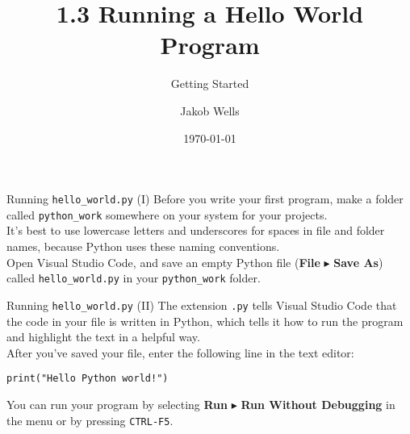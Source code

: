 \documentclass[aspectratio=169]{beamer}
\title{1.3 Running a Hello World Program}
\subtitle{Getting Started}
\author{Jakob Wells}
\begin{document}
\date{\today}


\begin{frame}
    \titlepage{}
\end{frame}


\begin{frame}[fragile]{Running \texttt{hello\_world.py} (I)}
    Before you write your first program, make a folder called \texttt{python\_work} somewhere on your system for your projects. \\
    \vspace{15pt}
    It's best to use lowercase letters and underscores for spaces in file and folder names, because Python uses these naming conventions.\\
    \vspace{15pt}
    Open Visual Studio Code, and save an empty Python file (\textbf{File} \(\blacktriangleright\) \textbf{Save As}) called \texttt{hello\_world.py} in your \texttt{python\_work} folder. \\
\end{frame}


\begin{frame}[fragile]{Running \texttt{hello\_world.py} (II)}
    The extension \texttt{.py} tells Visual Studio Code that the code in your file is written in Python, which tells it how to run the program and highlight the text in a helpful way. \\
    \vspace{15pt}
    After you've saved your file, enter the following line in the text editor:
    \vspace{5pt}
    \begin{Verbatim}[fontsize=\footnotesize]
print("Hello Python world!")
    \end{Verbatim}
    \vspace{15pt}
    You can run your program by selecting \textbf{Run} \(\blacktriangleright\) \textbf{Run Without Debugging} in the menu or by pressing \texttt{CTRL-F5}. \\
\end{frame}
\end{document}
